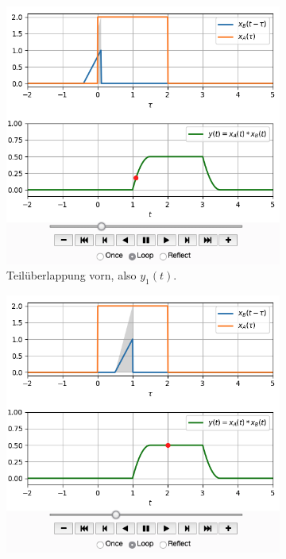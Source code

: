 \begin{figure}[h!]
\centering
\begin{subfigure}{0.45\textwidth}
\centering
\includegraphics[width=\textwidth]{../convolution_ct/conv_var1_1_1D3D68B312.png}
\caption{Teilüberlappung vorn, also $y_1(t)$.}
\label{fig:1D3D68B312_v1_1}
\end{subfigure}
\begin{subfigure}{0.45\textwidth}
\centering
\includegraphics[width=\textwidth]{../convolution_ct/conv_var1_2_1D3D68B312.png}

\end{subfigure}
\end{figure}
